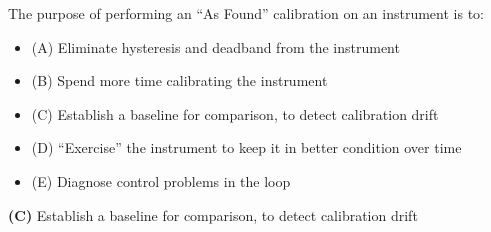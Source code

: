 

The purpose of performing an ``As Found'' calibration on an instrument is to:

\begin{itemize}
\item{(A)} Eliminate hysteresis and deadband from the instrument
\vskip 5pt 
\item{(B)} Spend more time calibrating the instrument
\vskip 5pt 
\item{(C)} Establish a baseline for comparison, to detect calibration drift
\vskip 5pt 
\item{(D)} ``Exercise'' the instrument to keep it in better condition over time
\vskip 5pt 
\item{(E)} Diagnose control problems in the loop
\end{itemize}







{\bf (C)} Establish a baseline for comparison, to detect calibration drift
 









